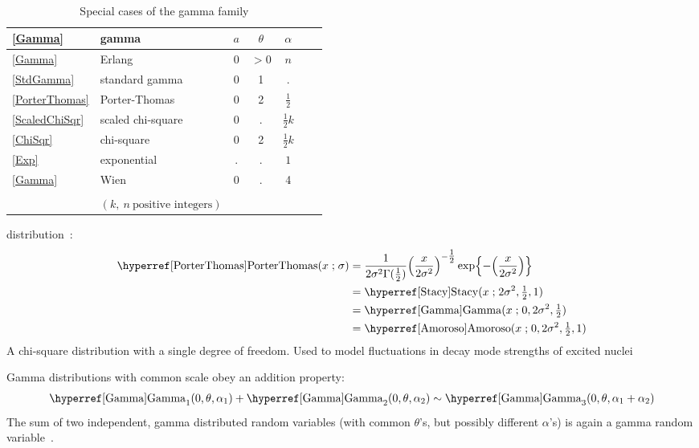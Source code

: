 \begin{table}[tp]
\begin{center}
\caption[Gamma distribution -- Special cases]{Special cases of the gamma family}
\label{GammaTable}
~\\
{\renewcommand{\arraystretch}{1.2} 
\begin{tabular}{llccccl}
\eqref{Gamma} & gamma & $a$ & $\theta$ & $\alpha$   \\ 
\hline
\eqref{Gamma} & Erlang & $0$ & $>\!\!0$ & $n$ \\
\eqref{StdGamma} &standard gamma & 0 & 1 & .  \\ 
\eqref{PorterThomas} & Porter-Thomas & 0 & 2 & $\tfrac{1}{2}$  \\
\eqref{ScaledChiSqr} & scaled chi-square & 0 & . & $\tfrac{1}{2}k$  \\
\eqref{ChiSqr} & chi-square & 0 & 2 & $\tfrac{1}{2}k$ \\
\eqref{Exp} & exponential & . & . & $1$  \\
\eqref{Gamma} & Wien & 0 & . & 4 \\
 \\
  & $(k,\ n\ \text{positive integers})$
 \end{tabular} 
}
\end{center}
\end{table}



 distribution~\cite{Porter1956a}:
\begin{align}
\label{PorterThomas}
\opr{PorterThomas}(x \given \sigma) 
&= \frac{1}{2\sigma^2\Gamma(\tfrac{1}{2})} \Left(\frac{x}{2\sigma^2}\Right)^{-\tfrac{1}{2}} 
\exp\Left\{-\Left(\frac{x}{2\sigma^2} \Right)\Right\} \checked \\
&=  \opr{Stacy}(x\given 2\sigma^2, \tfrac{1}{2},1)  \checked\notag \\
&=\opr{Gamma}(x\given 0, 2\sigma^2, \tfrac{1}{2}) \checked \notag \\
&=  \opr{Amoroso}(x\given  0, 2\sigma^2, \tfrac{1}{2}, 1) \checked \notag 
\end{align}
A chi-square distribution with a single degree of freedom.
Used to model fluctuations in decay mode strengths of excited nuclei~\cite{Porter1956a}




\label{GammaInterrelations}



Gamma distributions with common scale obey an addition property:
\begin{align*}
\opr{Gamma}_1(0, \theta, \alpha_1) +  \opr{Gamma}_2(0, \theta,\alpha_2) \sim \opr{Gamma}_3(0, \theta,\alpha_1+\alpha_2)
\checked
\end{align*}
The  sum of two independent, gamma distributed random variables (with common $\theta$'s, but possibly different $\alpha$'s) is again a gamma random variable~\cite{Johnson1994}.


